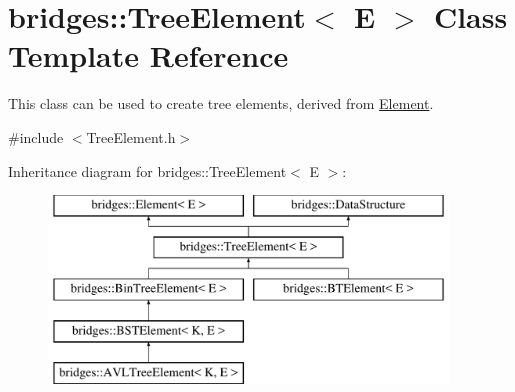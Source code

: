 \hypertarget{classbridges_1_1_tree_element}{}\section{bridges\+:\+:Tree\+Element$<$ E $>$ Class Template Reference}
\label{classbridges_1_1_tree_element}


This class can be used to create tree elements, derived from \hyperlink{classbridges_1_1_element}{Element}.  




{\ttfamily \#include $<$Tree\+Element.\+h$>$}

Inheritance diagram for bridges\+:\+:Tree\+Element$<$ E $>$\+:\begin{figure}[H]
\begin{center}
\leavevmode
\includegraphics[height=5.000000cm]{classbridges_1_1_tree_element}
\end{center}
\end{figure}
